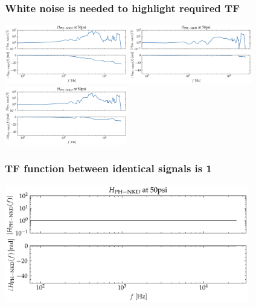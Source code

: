 \documentclass[aspectratio=169,9pt]{beamer}
\begin{document}
\begin{frame}
    \frametitle{White noise is needed to highlight required TF}
        \centering
        \includegraphics[width=0.4\textwidth]{sanity/50psi/PH-NKD/H_50psi_nn.png}
        \includegraphics[width=0.4\textwidth]{sanity/50psi/PH-NKD/H_50psi_fn.png}
        \includegraphics[width=0.4\textwidth]{sanity/50psi/PH-NKD/H_50psi_an.png}
\end{frame}

\begin{frame}
    \frametitle{TF function between identical signals is 1}
        \centering
        \includegraphics[width=0.8\textwidth]{sanity/50psi/PH-NKD/H_50psi_same.png}
        
\end{frame}
\end{document}

